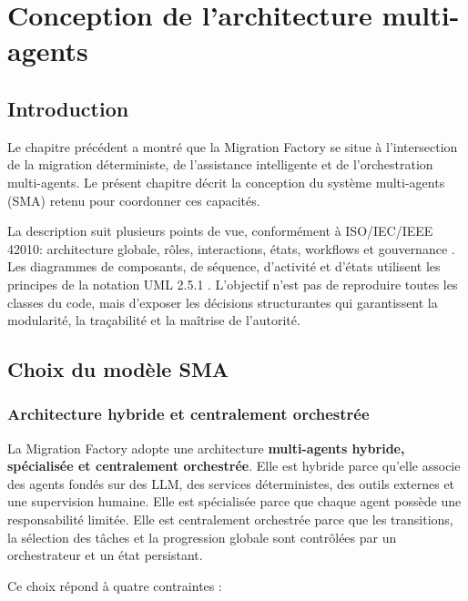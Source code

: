 \chapter{Conception de l'architecture multi-agents}

\section*{Introduction}

Le chapitre précédent a montré que la Migration Factory se situe à l'intersection de la migration déterministe, de l'assistance intelligente et de l'orchestration multi-agents. Le présent chapitre décrit la conception du système multi-agents (SMA) retenu pour coordonner ces capacités.

La description suit plusieurs points de vue, conformément à ISO/IEC/IEEE 42010: architecture globale, rôles, interactions, états, workflows et gouvernance \cite{iso42010}. Les diagrammes de composants, de séquence, d'activité et d'états utilisent les principes de la notation UML 2.5.1 \cite{omguml}. L'objectif n'est pas de reproduire toutes les classes du code, mais d'exposer les décisions structurantes qui garantissent la modularité, la traçabilité et la maîtrise de l'autorité.

\section{Choix du modèle SMA}

\subsection{Architecture hybride et centralement orchestrée}

La Migration Factory adopte une architecture \textbf{multi-agents hybride, spécialisée et centralement orchestrée}. Elle est hybride parce qu'elle associe des agents fondés sur des LLM, des services déterministes, des outils externes et une supervision humaine. Elle est spécialisée parce que chaque agent possède une responsabilité limitée. Elle est centralement orchestrée parce que les transitions, la sélection des tâches et la progression globale sont contrôlées par un orchestrateur et un état persistant.

Ce choix répond à quatre contraintes :


